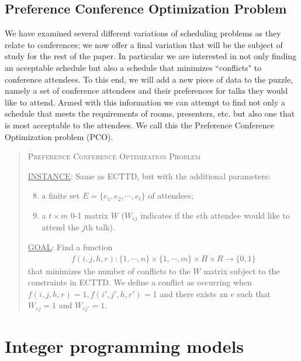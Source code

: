 \documentclass[]{article}
\theoremstyle{definition}
\theoremstyle{remark}
\numberwithin{equation}{section}
\begin{document}
\subsection{Preference Conference Optimization Problem}
We have examined several different variations of scheduling problems as they relate to conferences; we now offer a final variation that will be the subject of study for the rest of the paper. In particular we are interested in not only finding an acceptable schedule but also a schedule that minimizes ``conflicts" to conference attendees. To this end, we will add a new piece of data to the puzzle, namely a set of conference attendees and their preferences for talks they would like to attend. Armed with this information we can attempt to find not only a schedule that meets the requirements of rooms, presenters, etc. but also one that is most acceptable to the attendees. We call this the Preference Conference Optimization problem (PCO).
\begin{quote}
	\textsc{Preference Conference Optimization Problem}
	
	\underline{INSTANCE}: Same as ECTTD, but with the additional parameters:
	\begin{enumerate}[1.]
		\setcounter{enumi}{7}
		\item a finite set $E = \{e_1, e_2, \cdots, e_t\}$ of attendees;
		\item a $t \times m$ 0-1 matrix $W$ ($W_{ej}$ indicates if the $e$th attendee would like to attend the $j$th talk).
	\end{enumerate}
	
	\underline{GOAL}: Find a function 
	\begin{gather*}
		f(i,j,h,r) : \{1,\cdots,n\} \times \{1,\cdots,m\} \times H \times R \rightarrow \{0,1\}
	\end{gather*}
	that minimizes the number of conflicts to the $W$ matrix subject to the constraints in ECTTD. We define a conflict as occurring when $f(i,j,h,r)=1, f(i',j',h,r')=1$ and there exists an $e$ such that $W_{ej}=1$ and $W_{ej'}=1$.
\end{quote}

\section{Integer programming models}\label{sec.model}
\end{document}
